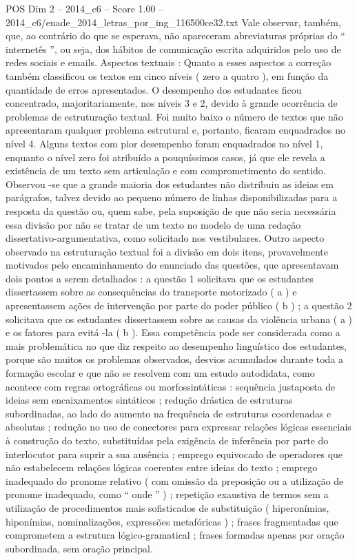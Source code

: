\begin{textsample}{POS Dim 2 – 2014\_c6 – Score 1.00 – 2014\_c6/enade\_2014\_letras\_por\_ing\_116500ce32.txt}
Vale observar, também, que, ao contrário do que se esperava, não apareceram abreviaturas próprias do “ internetês ”, ou seja, dos hábitos de comunicação escrita adquiridos pelo uso de redes sociais e emails.
Aspectos textuais : Quanto a esses aspectos a correção também classificou os textos em cinco níveis ( zero a quatro ), em função da quantidade de erros apresentados.
O desempenho dos estudantes ficou concentrado, majoritariamente, nos níveis 3 e 2, devido à grande ocorrência de problemas de estruturação textual.
Foi muito baixo o número de textos que não apresentaram qualquer problema estrutural e, portanto, ficaram enquadrados no nível 4.
Alguns textos com pior desempenho foram enquadrados no nível 1, enquanto o nível zero foi atribuído a pouquíssimos casos, já que ele revela a existência de um texto sem articulação e com comprometimento do sentido.
Observou -se que a grande maioria dos estudantes não distribuiu as ideias em parágrafos, talvez devido ao pequeno número de linhas disponibilizadas para a resposta da questão ou, quem sabe, pela suposição de que não seria necessária essa divisão por não se tratar de um texto no modelo de uma redação dissertativo-argumentativa, como solicitado nos vestibulares.
Outro aspecto observado na estruturação textual foi a divisão em dois itens, provavelmente motivados pelo encaminhamento do enunciado das questões, que apresentavam dois pontos a serem detalhados : a questão 1 solicitava que os estudantes dissertassem sobre as consequências do transporte motorizado ( a ) e apresentassem ações de intervenção por parte do poder público ( b ) ; a questão 2 solicitava que os estudantes dissertassem sobre as causas da violência urbana ( a ) e os fatores para evitá -la ( b ).
Essa competência pode ser considerada como a mais problemática no que diz respeito ao desempenho linguístico dos estudantes, porque são muitos os problemas observados, desvios acumulados durante toda a formação escolar e que não se resolvem com um estudo autodidata, como acontece com regras ortográficas ou morfossintáticas : sequência justaposta de ideias sem encaixamentos sintáticos ; redução drástica de estruturas subordinadas, ao lado do aumento na frequência de estruturas coordenadas e absolutas ; redução no uso de conectores para expressar relações lógicas essenciais à construção do texto, substituídas pela exigência de inferência por parte do interlocutor para suprir a sua ausência ; emprego equivocado de operadores que não estabelecem relações lógicas coerentes entre ideias do texto ; emprego inadequado do pronome relativo ( com omissão da preposição ou a utilização de pronome inadequado, como “ onde ” ) ; repetição exaustiva de termos sem a utilização de procedimentos mais sofisticados de substituição ( hiperonímias, hiponímias, nominalizações, expressões metafóricas ) ; frases fragmentadas que comprometem a estrutura lógico-gramatical ; frases formadas apenas por oração subordinada, sem oração principal.

\end{textsample}
